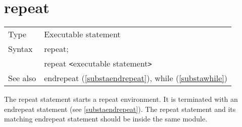 
\vspace{10mm}


\section{repeat}
\label{substarepeat}

\noindent \begin{tabular}{ll}
Type & Executable statement\\
Syntax & repeat; \\
       & repeat {\tt<}executable statement{\tt>}
\\ See also & endrepeat (\ref{substaendrepeat}), while (\ref{substawhile})
\end{tabular} \vspace{4mm}

\noindent The repeat statement starts a
repeat environment. It is terminated with an 
endrepeat statement (see \ref{substaendrepeat}). The 
repeat statement and its matching endrepeat statement should be inside the 
same module. \vspace{4mm}

